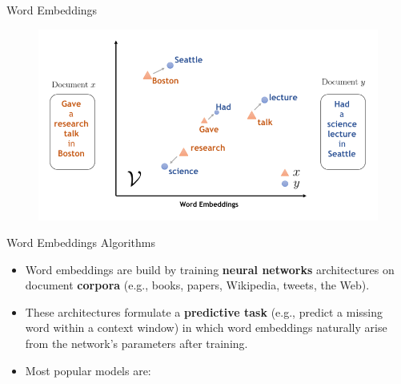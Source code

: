\documentclass[handout]{beamer}
\begin{document}
\begin{frame}{Word Embeddings}
\begin{figure}[h]
  \includegraphics[scale=0.7]{pics/embeddings2.png}
\end{figure}



\end{frame}



\begin{frame}{Word Embeddings Algorithms}
\begin{scriptsize}
\begin{itemize}
\item Word embeddings are build by training \textbf{neural networks} architectures on document \textbf{corpora} (e.g., books, papers, Wikipedia, tweets, the Web).

\item These architectures formulate a \textbf{predictive task} (e.g., predict a missing word within a context window) in which word embeddings naturally arise from the network's parameters after training.

\item Most popular models are:




\end{itemize}
\end{scriptsize}
\end{frame}
\end{document}
